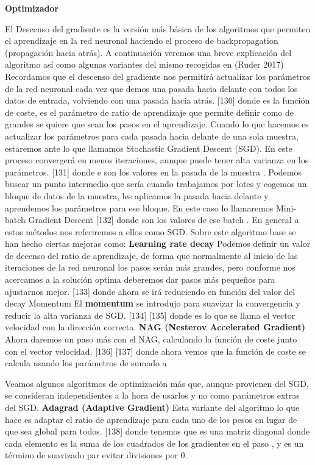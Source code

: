 \documentclass[
  a4paper,
  DIV=11,
  numbers=noendperiod]{scrreprt}
\begin{document}
\textbf{Optimizador}

El Descenso del gradiente es la versión más básica de los algoritmos que
permiten el aprendizaje en la red neuronal haciendo el proceso de
backpropagation (propagación hacia atrás). A continuación veremos una
breve explicación del algoritmo así como algunas variantes del mismo
recogidas en (Ruder 2017) Recordamos que el descenso del gradiente nos
permitirá actualizar los parámetros de la red neuronal cada vez que
demos una pasada hacia delante con todos los datos de entrada, volviendo
con una pasada hacia atrás. {[}130{]} donde es la función de coste, es
el parámetro de ratio de aprendizaje que permite definir como de grandes
se quiere que sean los pasos en el aprendizaje. Cuando lo que hacemos es
actualizar los parámetros para cada pasada hacia delante de una sola
muestra, estaremos ante lo que llamamos Stochastic Gradient Descent
(SGD). En este proceso convergerá en menos iteraciones, aunque puede
tener alta varianza en los parámetros. {[}131{]} donde e son los valores
en la pasada de la muestra . Podemos buscar un punto intermedio que
sería cuando trabajamos por lotes y cogemos un bloque de datos de la
muestra, les aplicamos la pasada hacia delante y aprendemos los
parámetros para ese bloque. En este caso lo llamaremos Mini-batch
Gradient Descent {[}132{]} donde son los valores de ese batch . En
general a estos métodos nos referiremos a ellos como SGD. Sobre este
algoritmo base se han hecho ciertas mejoras como: \textbf{Learning rate
decay} Podemos definir un valor de decenso del ratio de aprendizaje, de
forma que normalmente al inicio de las iteraciones de la red neuronal
los pasos serán más grandes, pero conforme nos acercamos a la solución
optima deberemos dar pasos más pequeños para ajustarnos mejor. {[}133{]}
donde ahora se irá reduciendo en función del valor del decay Momentum El
\textbf{momentum} se introdujo para suavizar la convergencia y reducir
la alta varianza de SGD. {[}134{]} {[}135{]} donde es lo que se llama el
vector velocidad con la dirección correcta. \textbf{NAG (Nesterov
Accelerated Gradient)} Ahora daremos un paso más con el NAG, calculando
la función de coste junto con el vector velocidad. {[}136{]} {[}137{]}
donde ahora vemos que la función de coste se calcula usando los
parámetros de sumado a

Veamos algunos algoritmos de optimización más que, aunque provienen del
SGD, se consideran independientes a la hora de usarlos y no como
parámetros extras del SGD. \textbf{Adagrad (Adaptive Gradient)} Esta
variante del algoritmo lo que hace es adaptar el ratio de aprendizaje
para cada uno de los pesos en lugar de que sea global para todos.
{[}138{]} donde tenemos que es una matriz diagonal donde cada elemento
es la suma de los cuadrados de los gradientes en el paso , y es un
término de suavizado par evitar divisiones por 0.
\end{document}

